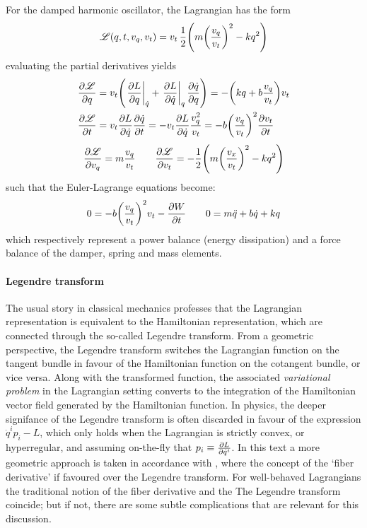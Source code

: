 For the damped harmonic oscillator, the Lagrangian has the form
$$ \mathscr{L}(q, t, v_q, v_t) = v_t\,\frac{1}{2}\qty(m\qty(\frac{v_q}{v_t})^2 - kq^2) $$
evaluating the partial derivatives yields
\begin{equation}
    \begin{split}
        \pdv{\mathscr{L}}{q} &= v_t \qty(\left.\pdv{L}{q}\right|_{\dot{q}} + \left.\pdv{L}{\dot{q}}\right|_{q}\pdv{\dot{q}}{q}) 
        = -\qty(kq + b\frac{v_q}{v_t})v_t \\
        \pdv{\mathscr{L}}{t} &= v_t \pdv{L}{\dot{q}}\pdv{\dot{q}}{t} = -v_t\pdv{L}{\dot{q}}\frac{v_q^2}{v_t} = -b\qty(\frac{v_q}{v_t})^2 \pdv{v_t}{t}
    \end{split}
\end{equation}
$$ \pdv{\mathscr{L}}{v_q} = m\frac{v_q}{v_t} \qquad \pdv{\mathscr{L}}{v_t} = -\frac{1}{2}\qty(m\qty(\frac{v_x}{v_t})^2 - kq^2) $$
such that the Euler-Lagrange equations become:
$$ 0 = -b\qty(\frac{v_q}{v_t})^2 v_t - \pdv{W}{t}  \qquad  0 = m\ddot{q} + b\dot{q} + kq$$
which respectively represent a power balance (energy dissipation) and a force balance of the damper, spring and mass elements.

\paragraph{Legendre transform} The usual story in classical mechanics professes that the Lagrangian representation is equivalent to the Hamiltonian representation, which are connected through the so-called Legendre transform. From a geometric perspective, the Legendre transform switches the Lagrangian function on the tangent bundle in favour of the Hamiltonian function on the cotangent bundle, or vice versa. Along with the transformed function, the associated \emph{variational problem} in the Lagrangian setting converts to the integration of the Hamiltonian vector field generated by the Hamiltonian function. In physics, the deeper signifance of the Legendre transform is often discarded in favour of the expression $\dot{q}^ip_i - L$, which only holds when the Lagrangian is strictly convex, or hyperregular, and assuming on-the-fly that $p_i \equiv \pdv{L}{\dot{q}^i} $. In this text a more geometric approach is taken in accordance with \citet{Abraham1978}, where the concept of the `fiber derivative' if favoured over the Legendre transform. For well-behaved Lagrangians the traditional notion of the fiber derivative and the 
The Legendre transform coincide; but if not, there are some subtle complications that are relevant for this discussion. 

